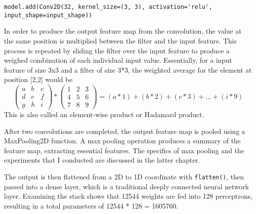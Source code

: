 \documentclass{article}
\begin{document}
\begin{lstlisting}
model.add(Conv2D(32, kernel_size=(3, 3), activation='relu', input_shape=input_shape))
\end{lstlisting}

In order to produce the output feature map from the convolution, the value at the same position is multiplied between the filter and the input feature. This process is repeated by sliding the filter over the input feature to produce a weighed combination of each individual input value. Essentially, for a input feature of size 3x3 and a filter of size 3*3, the weighted average for the element at position [2,2] would be
\[
    \begin{pmatrix}
        a & b & c \\
        d & e & f \\
        g & h & i
    \end{pmatrix}
    *
    \begin{pmatrix}
        1 & 2 & 3 \\
        4 & 5 & 6 \\
        7 & 8 & 9
    \end{pmatrix}
    =
    (a * 1) + (b * 2) +  (c * 3) + ... + (i * 9)
\]
This is also called an element-wise product or Hadamard product. \autocite[34]{deep16}

After two convolutions are completed, the output feature map is pooled using a MaxPooling2D function. A max pooling operation produces a summary of the feature map, extracting essential features. The specifics of max pooling and the experiments that I conducted are discussed in the latter chapter.

The output is then flattened from a 2D to 1D coordinate with \texttt{flatten()}, then passed into a dense layer, which is a traditional deeply connected neural network layer. Examining the stack shows that 12544 weights are fed into 128 perceptrons, resulting in a total parameters of 12544 * 128 = 1605760.
\end{document}
